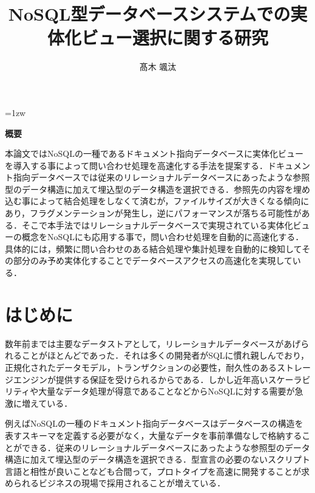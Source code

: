 \documentclass[a4paper,11pt]{ujreport}
\title{NoSQL型データベースシステムでの実体化ビュー選択に関する研究}
\author{髙木 颯汰}
\begin{document}
\maketitle
\thispagestyle{empty}
\newpage

\thispagestyle{empty}
\vspace*{20pt plus 1fil}
\parindent=1zw
\noindent
\begin{center}
	{\bf 概要}
	\vspace{5mm}
\end{center}
本論文ではNoSQLの一種であるドキュメント指向データベースに実体化ビューを導入する事によって問い合わせ処理を高速化する手法を提案する．ドキュメント指向データベースでは従来のリレーショナルデータベースにあったような参照型のデータ構造に加えて埋込型のデータ構造を選択できる．参照先の内容を埋め込む事によって結合処理をしなくて済むが，ファイルサイズが大きくなる傾向にあり，フラグメンテーションが発生し，逆にパフォーマンスが落ちる可能性がある．そこで本手法ではリレーショナルデータベースで実現されている実体化ビューの概念をNoSQLにも応用する事で，問い合わせ処理を自動的に高速化する．具体的には，頻繁に問い合わせのある結合処理や集計処理を自動的に検知してその部分のみ予め実体化することでデータベースアクセスの高速化を実現している．

\par
\vspace{0pt plus 1fil}
\newpage

\tableofcontents
\listoffigures

\pagebreak \setcounter{page}{1}


\chapter{はじめに}

数年前までは主要なデータストアとして，リレーショナルデータベースがあげられることがほとんどであった．それは多くの開発者がSQLに慣れ親しんでおり，正規化されたデータモデル，トランザクションの必要性，耐久性のあるストレージエンジンが提供する保証を受けられるからである\cite{Sky株式会社201212}．しかし近年高いスケーラビリティや大量なデータ処理が得意であることなどからNoSQLに対する需要が急激に増えている．

例えばNoSQLの一種のドキュメント指向データベースはデータベースの構造を表すスキーマを定義する必要がなく，大量なデータを事前準備なしで格納することができる．従来のリレーショナルデータベースにあったような参照型のデータ構造に加えて埋込型のデータ構造を選択できる．型宣言の必要のないスクリプト言語と相性が良いことなども合間って，プロトタイプを高速に開発することが求められるビジネスの現場で採用されることが増えている\cite{渡部201602}．
\end{document}
